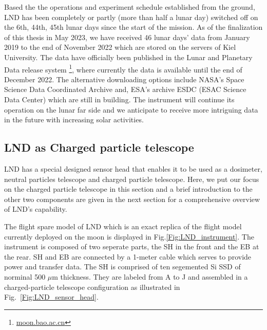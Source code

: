 Based the the operations and experiment schedule established from the ground, \ac{LND} has been completely or partly (more than half a lunar day) switched off on the 6th, 44th, 45th lunar days since the start of the mission. As of the finalization of this thesis in May 2023, we have received 46 lunar days' data from January 2019 to the end of November 2022 which are stored on the servers of Kiel University. The data have officially been published in the Lunar and Planetary Data release system \footnote{\url{moon.bao.ac.cn}}, where currently the data is available until the end of December 2022. 
The alternative downloading options include \ac{NASA}'s Space Science Data Coordinated Archive and, \ac{ESA}'s archive ESDC (ESAC Science Data Center) which are still in building. The instrument will continue its operation on the lunar far side and we anticipate to receive more intriguing data in the future with increasing solar activities.



\subsection{LND as Charged particle telescope}

\ac{LND} has a special designed sensor head that enables it to be used as a dosimeter, neutral particles telescope and charged particle telescope. Here, we put our focus on the charged particle telescope in this section and a brief introduction to the other two components are given in the next section for a comprehensive overview of LND's capability.

The flight spare model of \ac{LND} which is an exact replica of the flight model currently deployed on the moon is displayed in Fig.\ref{Fig:LND_instrument}. The instrument is composed of two seperate parts, the \acl{SH} in the front and the \acl{EB} at the rear. \ac{SH} and \ac{EB} are connected by a 1-meter cable which serves to provide power and transfer data. 
The \ac{SH} is comprised of ten segemented Si \acs{SSD} of norminal 500 $\mu$m thickness. They are labeled from A to J and assembled in a charged-particle telescope configuration as illustrated in Fig.~\ref{Fig:LND_sensor_head}.

